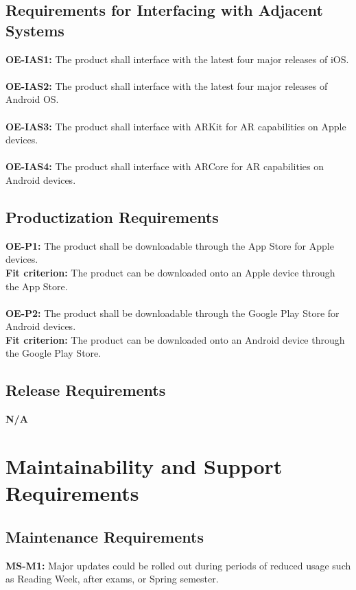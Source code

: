\documentclass[12pt]{article}
\begin{document}
\subsection{Requirements for Interfacing with Adjacent Systems}
  \textbf{OE-IAS1:} The product shall interface with the latest four major releases of iOS.\\\\
  \textbf{OE-IAS2:} The product shall interface with the latest four major releases of Android OS.\\\\
  \textbf{OE-IAS3:} The product shall interface with ARKit for AR capabilities on Apple devices.\\\\
  \textbf{OE-IAS4:} The product shall interface with ARCore for AR capabilities on Android devices.\\
\subsection{Productization Requirements}
  \textbf{OE-P1:} The product shall be downloadable through the App Store for Apple devices.\\
  \textbf{Fit criterion:} The product can be downloaded onto an Apple device through the App Store.\\\\
  \textbf{OE-P2:} The product shall be downloadable through the Google Play Store for Android devices.\\
  \textbf{Fit criterion:} The product can be downloaded onto an Android device through the Google Play Store.\\
\subsection{Release Requirements}
  \textbf{N/A}\\

\section{Maintainability and Support Requirements}
\subsection{Maintenance Requirements}
  \textbf{MS-M1:} Major updates could be rolled out during periods of reduced usage such as Reading Week, after exams, or Spring semester.\\
\end{document}
